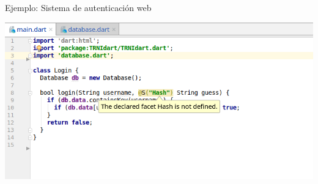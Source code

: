 \documentclass[aspectratio=169,18pt]{beamer}
\begin{document}

\begin{frame}[fragile]{Ejemplo: Sistema de autenticación web}
	\begin{center}
		\includegraphics[width=1.0\textwidth]{images/login3.png}
	\end{center}
\end{frame}

%
\end{document}
